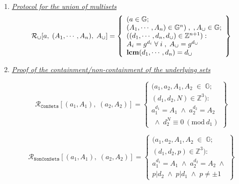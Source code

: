 \documentclass[11pt, lettersize, notitlepage, leqno, footskip=0.6cm]{article}
\newcommand{\bz}{\mathbb Z}
\newcommand{\ttt}{\texttt}
\newcommand{\sett}{\ttt{Set}}
\newcommand{\mc}{\mathcal}
\newcommand{\mb}{\mathbb}
\newcommand{\mbf}{\mathbf}
\newcommand{\sub}{\subseteq}
\newcommand{\mcM}{\mc{M}}
\newcommand{\vs}{\vspace{-0.15cm}}
\newcommand{\noin}{\noindent}
\newcommand{\Mod}[1]{\ (\mathrm{mod}\ #1)}
\newcommand{\LCM}{\mbf{lcm}}
\newcommand{\GCD}{\mbf{gcd}}
\numberwithin{equation}{section}
\begin{document}
{{{\begin{enumerate}[wide, labelwidth=!, labelindent=0pt]
\[\begin{array}{l}
  \GCD(d_1, \cdots, d_n) = d_{\tt{\cap}}
  \end{array}\right\}
\] 

\item \hyperlink{Uni}{\textit{Protocol for the union of multisets }}\vs \[
  \mc{R}_{\tt{\cup}}[a,\; (A_1,\cdots,A_n),\; A_{\tt{\cup}}] = \left\{\begin{array}{l}
    (a\in\mb{G};\;\\
     (A_1,\cdots,A_n)\in \mb{G}^{n})\;,\;,A_{\tt{\cup}}\in\mb{G};\\
    ((d_1,\cdots,d_n, d_{\tt{\cup}})\in\bz^{n+1}): \\
    A_i = g^{d_i}\;\forall\;i\;,\; A_{\tt{\cup}} = g^{d_{\tt{\cup}}}   \\
    
  \LCM(d_1, \cdots, d_n) = d_{\tt{\cup}}
  \end{array}\right\}
\] 

\item \hyperlink{Sets}{\textit{Proof of the containment/non-containment of the underlying sets}}\vspace{-0.3cm}


\[
  \mc{R}_{\ttt{ConSets}}[(a_1, A_1),\;(a_2,A_2)] = \left\{\begin{array}{l}
    (a_1,a_2, A_1, A_2\;\in\;\mb{G}; \\
    (d_1, d_2, N) \in \bz^3):   \\
    a_1^{d_1} = A_1\;\wedge\;a_2^{d_2} = A_2\\
    \;\wedge\;d_2^{N}\equiv 0\Mod{d_1} 
  \end{array}\right\}
\]



\[
  \mc{R}_{\ttt{NonConSets}}[(a_1, A_1),\;(a_2,A_2)] = \left\{\begin{array}{l}
    (a_1,a_2, A_1, A_2\;\in\;\mb{G}; \\
    (d_1, d_2, p) \in \bz^3):   \\
    a_1^{d_1} = A_1\;\wedge\;a_2^{d_2} = A_2\;\wedge\\
   p \big| d_2\; \wedge\; p \big| d_1 \; \wedge\; p\neq \pm 1 
  \end{array}\right\}
\]




\end{enumerate}}}}
\end{document}
